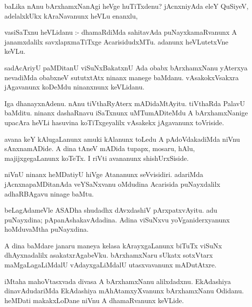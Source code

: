 \documentclass{article}
\begin{document}
\begin{mn}
baLika nAnu bArxhamxNanAgi heVge huTiTxdenu? jAcnxniyAda eleY QuSiyeV, 
adelalxkUkx kAraNavanunx heVLu enanxlu,
\end{mn}

\begin{mn}
vasiSaTxnu heVLidanu :- dhamaRdiMda sahitavAda puNayxkamaRvanunx A 
janamxdalilx savxlapxmaTiTxge AcarisidudxMTu.  adanunx heVLutetxVne keVLu.
\end{mn}

\begin{mn}
sadAcAriyU paMDitanU viSuNxBakatxnU Ada obabx bArxhamxNanu yAterxya nevadiMda obabxneV 
sututxtAtx ninanx manege baMdanu.  vAsakokxVsakxra jAgavanunx koDeMdu ninanxnunx keVLidanu.
\end{mn}

\begin{mn}
Iga dhanayxnAdenu.  nAnu tiVthaRyAterx mADidaMtAyitu.  tiVthaRda PalavU baMditu.  
ninanx dashaRnavu iSaTxnunx uMTumADiteMdu A bArxhamxNanige upacAra heVLi 
hasuvina koTiTxgeyalilx  vAsakekx jAgavanunx toVriside.
\end{mn}

\begin{mn}
avana keY kAlugaLanunx amuki kAlanunx toLedu A pAdoVdakadiMda niVnu sAnxnamADide. A dina 
tAneV mADida tupapx, mosaru, hAlu, majijxgegaLanunx koTeTx.  I riVti avananunx shishUrxSiside.
\end{mn}

\begin{mn}
niVnU ninanx heMDatiyU hiVge Atananunx seVvisidiri.  adariMda jAcnxnapaMDitanAda 
veYSaNxvanu oMdudina Acarisida puNayxdalilx  adhaRBAgavu ninage baMtu.
\end{mn}

\begin{mn}
beLagAdameVle ASADha shudadhx dAvxdashiV pArxpatxvAyitu. adu puNayxdina; 
pApanAshakavAdadina.  Adina viSuNxvu  yoVganiderxyanunx hoMduvaMtha puNayxdina.
\end{mn}

\begin{mn}
A dina baMdare janaru maneya kelasa kArayxgaLanunx biTuTx viSuNx dhAyxnadalilx 
asakatxrAgabeVku.  bArxhamxNaru  sUkatx sotxVtarx maMgaLagaLiMdalU 
vAdayxgaLiMdalU  utasxvavanunx mADutAtxre. 
\end{mn}

\begin{mn}
iMtaha mahoVtasxvada divasa A bArxhamxNanu  alilxdadxnu.  EkAdashiya dinavAdudariMda 
EkAdashiya mAhAtamxyXvanunx bArxhamxNanu Odidanu.  heMDati makakxLoDane niVnu A dhamaRvanunx keVLide.
\end{mn}
\end{document}
